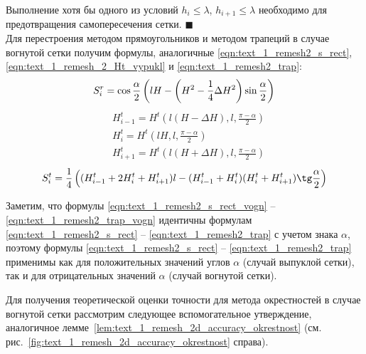 \documentclass[
11pt,%
tightenlines,%
twoside,%
onecolumn,%
nofloats,%
nobibnotes,%
nofootinbib,%
superscriptaddress,%
noshowpacs,%
centertags]%
{revtex4}
\begin{document}
Выполнение хотя бы одного из условий $h_i \le \lambda$, $h_{i+1} \le \lambda$ необходимо для предотвращения самопересечения сетки.
$\blacksquare$\\

Для перестроения методом прямоугольников и методом трапеций в случае вогнутой сетки получим формулы, аналогичные \eqref{eqn:text_1_remesh2_s_rect}, \eqref{eqn:text_1_remesh_2_Ht_vypukl} и \eqref{eqn:text_1_remesh2_trap}:
\begin{equation}\label{eqn:text_1_remesh2_s_rect_vogn}
	S_i^r = \cos \frac{\alpha}{2} \left( lH - \left( H^2 - \frac{1}{4} \Delta H^2 \right) \sin \frac{\alpha}{2} \right) \\
\end{equation}
\begin{equation}\label{eqn:text_1_remesh_2_Ht_vogn}
	\begin{aligned}
	& H_{i - 1}^t = H^t\left(l(H - \Delta H), l, \frac{\pi - \alpha}{2}\right) \\ 
	& H_i^t = H^t\left(lH, l, \frac{\pi - \alpha}{2}\right) \\
	& H_{i + 1}^t = H^t\left(l(H + \Delta H), l, \frac{\pi - \alpha}{2}\right)
	\end{aligned}
\end{equation}
\begin{equation}\label{eqn:text_1_remesh2_trap_vogn}
	S_i^t = \frac{1}{4} \left( (H_{i - 1}^t + 2 H_i^t + H_{i + 1}^t)l - (H_{i - 1}^t + H_i^t) (H_i^t + H_{i+1}^t) \tg \frac{\alpha}{2} \right)
\end{equation}

Заметим, что формулы \eqref{eqn:text_1_remesh2_s_rect_vogn} -- \eqref{eqn:text_1_remesh2_trap_vogn} идентичны формулам \eqref{eqn:text_1_remesh2_s_rect} -- \eqref{eqn:text_1_remesh2_trap} с учетом знака $\alpha$, поэтому формулы \eqref{eqn:text_1_remesh2_s_rect} -- \eqref{eqn:text_1_remesh2_trap} применимы как для положительных значений углов $\alpha$ (случай выпуклой сетки), так и для отрицательных значений $\alpha$ (случай вогнутой сетки).

Для получения теоретической оценки точности для метода окрестностей в случае вогнутой сетки рассмотрим следующее вспомогательное утверждение, аналогичное лемме~\ref{lem:text_1_remesh_2d_accuracy_okrestnost} (см. рис.~\ref{fig:text_1_remesh_2d_accuracy_okrestnost} справа).
\end{document}
